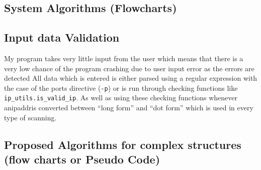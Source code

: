 \documentclass[titlepage]{article}
\let\Oldsubsection\subsection{}
\renewcommand{\subsection}{\FloatBarrier\Oldsubsection}
\begin{document}
\subsection{System Algorithms (Flowcharts)}

\textbf{\color{red}{When I have finished the first draft of the text bits I will add pictures / flowcharts}}

\subsection{Input data Validation}

My program takes very little input from the user which means that there is a very low chance of the 
program crashing due to user input error as the errors are detected All data which is entered is 
either parsed using a regular expression with the case of the \glspl{port} directive (\verb|-p|) or 
is run through checking functions like \verb|ip_utils.is_valid_ip|. As well as using these checking 
functions whenever an\gls{ipaddr}is converted between ``long form'' and ``dot form'' which is used 
in every type of scanning.

\subsection{Proposed Algorithms for complex structures (flow charts or Pseudo Code)}

\begin{algorithm}
  \caption{%
  My algorithm for turning a \gls{cidr} specified \gls{subnet} into a list of actual \gls{ipaddr}es
}\label{ip_range}
  \begin{algorithmic}[1]
    \EndFor{}
    \EndFor{}
    \EndProcedure{}
  \end{algorithmic}
\end{algorithm}
\end{document}
